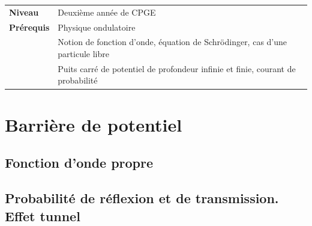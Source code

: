 \documentclass[10pt]{beamer}
\begin{document}
\begin{frame}{}
    \titlepage

    \begin{tabularx}{\textwidth}{l@{:\,\,}X}
        \textbf{Niveau} 	  &	Deuxième année de CPGE\\
        \textbf{Prérequis} & Physique ondulatoire\\
        &			Notion de fonction d'onde, équation de Schrödinger, cas d'une particule libre\\
        & 			Puits carré de potentiel de profondeur infinie et finie, courant de probabilité
    \end{tabularx}
\end{frame}

\section{Barrière de potentiel}
\subsection{Fonction d'onde propre}
\subsection{Probabilité de réflexion et de transmission. Effet tunnel}
\end{document}

